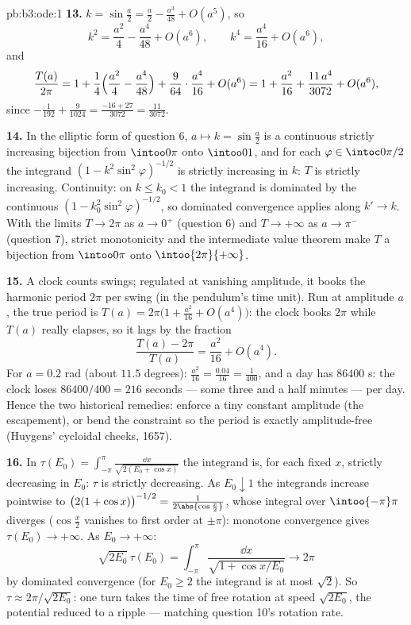 \begin{solution}{pb:b3:ode:1}
\textbf{13.} $k = \sin\frac a2 = \frac a2 - \frac{a^3}{48} +
O(a^5)$, so
\[
k^2 = \frac{a^2}4 - \frac{a^4}{48} + O(a^6),
\qquad
k^4 = \frac{a^4}{16} + O(a^6) ,
\]
and
\[
\frac{T(a)}{2\pi} = 1 + \frac14\Bigl(\frac{a^2}4 -
\frac{a^4}{48}\Bigr) + \frac9{64}\cdot\frac{a^4}{16} +
O(a^6)
= 1 + \frac{a^2}{16} + \frac{11\,a^4}{3072} + O(a^6) ,
\]
since $-\frac1{192} + \frac9{1024} = \frac{-16 + 27}{3072}
= \frac{11}{3072}$.

\textbf{14.} In the elliptic form of question 6, $a \mapsto
k = \sin\frac a2$ is a continuous strictly increasing
bijection from $\intoo0\pi$ onto $\intoo01$, and for each
$\varphi \in \intoc0{\pi/2}$ the integrand $(1 -
k^2\sin^2\varphi)^{-1/2}$ is strictly increasing in $k$: $T$
is strictly increasing. Continuity: on $k \leq k_0 < 1$ the
integrand is dominated by the continuous $(1 -
k_0^2\sin^2\varphi)^{-1/2}$, so dominated convergence
applies along $k' \to k$. With the limits $T \to 2\pi$ as $a
\to 0^+$ (question 6) and $T \to +\infty$ as $a \to \pi^-$
(question 7), strict monotonicity and the intermediate value
theorem make $T$ a bijection from $\intoo0\pi$ onto
$\intoo{2\pi}{+\infty}$.

\textbf{15.} A clock counts swings; regulated at vanishing
amplitude, it books the harmonic period $2\pi$ per swing (in
the pendulum's time unit). Run at amplitude $a$, the true
period is $T(a) = 2\pi\bigl(1 + \frac{a^2}{16} +
O(a^4)\bigr)$: the clock books $2\pi$ while $T(a)$ really
elapses, so it lags by the fraction
\[
\frac{T(a) - 2\pi}{T(a)} = \frac{a^2}{16} + O(a^4) .
\]
For $a = 0.2$ rad (about $11.5$ degrees): $\frac{a^2}{16} =
\frac{0.04}{16} = \frac1{400}$, and a day has $86400$ s: the
clock loses $86400/400 = 216$ seconds --- some three and a
half minutes --- per day. Hence the two historical remedies:
enforce a tiny constant amplitude (the escapement), or bend
the constraint so the period is exactly amplitude-free
(Huygens' cycloidal cheeks, 1657).

\textbf{16.} In $\tau(E_0) = \int_{-\pi}^{\pi}\frac{\dd
x}{\sqrt{2(E_0 + \cos x)}}$ the integrand is, for each fixed
$x$, strictly decreasing in $E_0$: $\tau$ is strictly
decreasing. As $E_0 \downarrow 1$ the integrands increase
pointwise to $\bigl(2(1 + \cos x)\bigr)^{-1/2} =
\frac1{2\abs{\cos\frac x2}}$, whose integral over
$\intoo{-\pi}\pi$ diverges ($\cos\frac x2$ vanishes to first
order at $\pm\pi$): monotone convergence gives $\tau(E_0)
\to +\infty$. As $E_0 \to +\infty$:
\[
\sqrt{2E_0}\,\tau(E_0) = \int_{-\pi}^{\pi}
\frac{\dd x}{\sqrt{1 + \cos x/E_0}} \longrightarrow 2\pi
\]
by dominated convergence (for $E_0 \geq 2$ the integrand is
at most $\sqrt2$). So $\tau \approx 2\pi/\sqrt{2E_0}$: one
turn takes the time of free rotation at speed $\sqrt{2E_0}$,
the potential reduced to a ripple --- matching question
10's rotation rate.


\end{solution}
